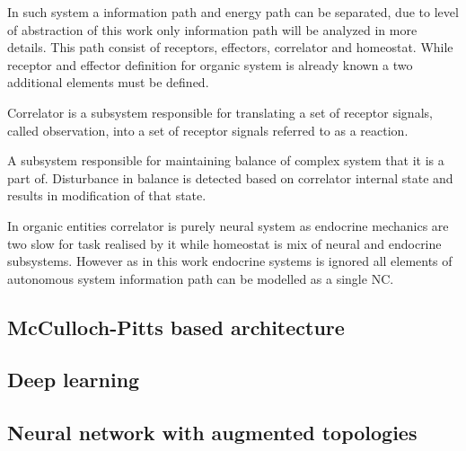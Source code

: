 In such system a information path and energy path can be separated, due to level of abstraction
of this work only information path will be analyzed in more details. This path consist of 
receptors, effectors, correlator and homeostat.  While receptor and effector definition for 
organic system is already known a two additional elements must be defined.
\begin{definition}[Correlator]
	Correlator is a subsystem responsible for translating a set of receptor signals, called
	observation, into a set of receptor signals referred to as a reaction.
\end{definition}
\begin{definition}[Homeostat]
	A subsystem responsible for maintaining balance of complex system that it is a part of.
	Disturbance in balance is detected based on correlator internal state and results in 
	modification of that state.
\end{definition}
In organic entities correlator is purely neural system as endocrine mechanics are two slow for
task realised by it while homeostat is mix of neural and endocrine subsystems. 
However as in this work endocrine systems is ignored all elements of autonomous system 
information path can be modelled as a single NC. 

\FloatBarrier
\subsection{McCulloch-Pitts based architecture}

\FloatBarrier
\subsection{Deep learning}

\FloatBarrier
\subsection{Neural network with augmented topologies}
